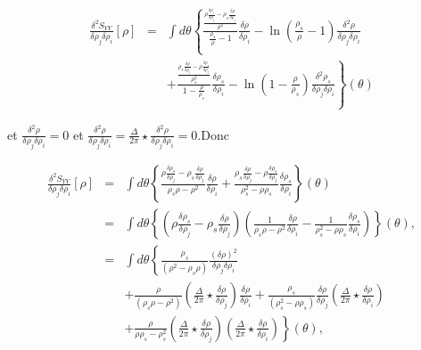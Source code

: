 	\begin{eqnarray}
		\frac{ \delta^2 S_{YY} }{ \delta \rho_j\delta \rho_i } [\rho ]  & = &\int  d\theta\left \{ \frac{\frac{\rho \frac{\delta \rho_s}{\delta \rho_j}- \rho_s\frac{\delta \rho}{\delta \rho_j}}{\rho^2}}{\frac{\rho_s}{\rho} -1}\frac{\delta \rho}{\delta \rho_i}  - \ln \left ( \frac{ \rho_s}{ \rho} - 1 \right )\frac{\delta^2 \rho}{\delta \rho_j\delta \rho_i} \right .\\
		& & +\left .  \frac{\frac{\rho_s \frac{\delta \rho}{\delta \rho_j}- \rho\frac{\delta \rho_s}{\delta \rho_j}}{\rho_s^2}}{1 - \frac{\rho}{\rho_s}}\frac{\delta \rho_s}{\delta \rho_i}  - \ln \left (1- \frac{ \rho}{ \rho_s}  \right )\frac{\delta^2 \rho_s}{\delta \rho_j\delta \rho_i}\right \} ( \theta ) 
	\end{eqnarray}
	
	et $\frac{\delta^2 \rho}{\delta \rho_j\delta \rho_i} =0 $ et $\frac{\delta^2 \rho}{\delta \rho_j\delta \rho_i} = \frac{\Delta}{2\pi} \star \frac{\delta^2 \rho}{\delta \rho_j\delta \rho_i} = 0 $.Donc 
	
	\begin{eqnarray}
		\frac{ \delta^2 S_{YY} }{ \delta \rho_j\delta \rho_i } [\rho ]  & = &\int  d\theta\left \{ \frac{\rho \frac{\delta \rho_s}{\delta \rho_j}- \rho_s\frac{\delta \rho}{\delta \rho_j}}{\rho_s\rho -\rho^2 }\frac{\delta \rho}{\delta \rho_i}  + \frac{\rho_s \frac{\delta \rho}{\delta \rho_j}- \rho\frac{\delta \rho_s}{\delta \rho_j}}{\rho_s^2 - \rho\rho_s}\frac{\delta \rho_s}{\delta \rho_i} \right \}(\theta) \\	
		& = & 	\int  d\theta\left \{ \left ( \rho \frac{\delta \rho_s}{\delta \rho_j}- \rho_s\frac{\delta \rho}{\delta \rho_j} \right ) \left ( \frac{1}{\rho_s\rho -\rho^2 }\frac{\delta \rho}{\delta \rho_i}  - \frac{1}{\rho_s^2 - \rho\rho_s}\frac{\delta \rho_s}{\delta \rho_i} \right )  \right \}(\theta),\\
		& = & \int  d\theta\left \{  \frac{\rho_s}{(\rho^2  - \rho_s\rho)} \frac{(\delta \rho)^2}{\delta \rho_j \delta \rho_i} \right . \\
		&  &  +  \left . \frac{\rho }{(\rho_s\rho -\rho^2) } \left (  \frac{\Delta}{2\pi} \star\frac{\delta \rho}{\delta \rho_j}   \right ) \frac{\delta \rho}{\delta \rho_i}+ \frac{\rho_s }{( \rho_s^2 - \rho \rho_s) }\frac{\delta \rho}{\delta \rho_j} \left (  \frac{\Delta}{2\pi} \star\frac{\delta \rho}{\delta \rho_i} \right )  \right . \\
		& & + \left .  \frac{\rho }{\rho\rho_s - \rho_s^2 }\left (  \frac{\Delta}{2\pi} \star\frac{\delta \rho}{\delta \rho_j} \right )\left (  \frac{\Delta}{2\pi} \star\frac{\delta \rho}{\delta \rho_i} \right )  \right \}(\theta),
	\end{eqnarray}
	
